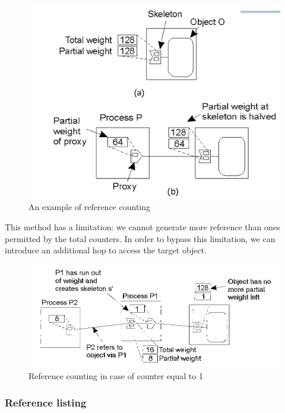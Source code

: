 \begin{figure}[h]
    \caption{An example of reference counting}
    \includegraphics[scale=0.5]{src/images/naming/reference-counting.png}
    \centering
\end{figure}

This method has a limitation: we cannot generate more reference than
ones permitted by the total counters. In order to bypass this
limitation, we can introduce an additional hop to access the target
object.

\begin{figure}[h]
    \caption{Reference counting in case of counter equal to 1}
    \includegraphics[scale=0.3]{src/images/naming/reference-counting-new-counter.png}
    \centering
\end{figure}

\subsubsection{Reference listing}

